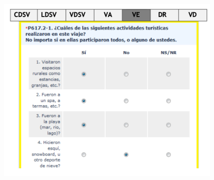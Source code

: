 \documentclass[
  openany]{book}
\begin{document}
\begin{figure}

{\centering \includegraphics[width=1\linewidth]{imagenes/figura6-113} 

}

\end{figure}
\end{document}
